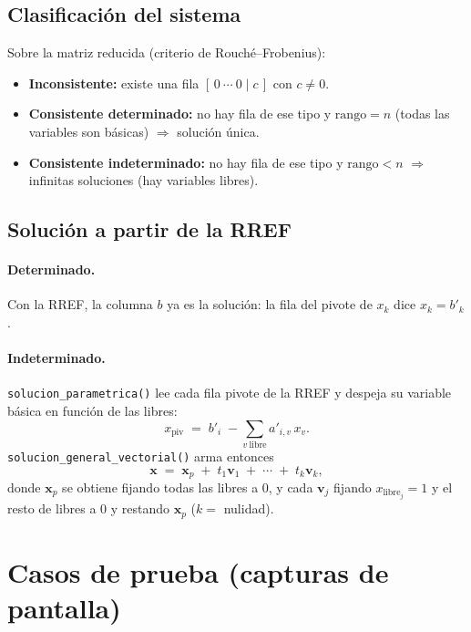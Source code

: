\documentclass[11pt,a4paper]{article}
\begin{document}
\subsection{Clasificaci\'on del sistema}

Sobre la matriz reducida (criterio de Rouch\'e--Frobenius):
\begin{itemize}[nosep]
  \item \textbf{Inconsistente:} existe una fila $[\,0\ \cdots\ 0 \mid c\,]$ con
        $c \neq 0$.
  \item \textbf{Consistente determinado:} no hay fila de ese tipo y
        $\text{rango} = n$ (todas las variables son b\'asicas) $\Rightarrow$
        soluci\'on \'unica.
  \item \textbf{Consistente indeterminado:} no hay fila de ese tipo y
        $\text{rango} < n$ $\Rightarrow$ infinitas soluciones (hay variables
        libres).
\end{itemize}

\subsection{Soluci\'on a partir de la RREF}

\paragraph{Determinado.} Con la RREF, la columna $b$ ya es la soluci\'on: la fila
del pivote de $x_k$ dice $x_k = b'_k$.

\paragraph{Indeterminado.} \texttt{solucion\_parametrica()} lee cada fila pivote de
la RREF y despeja su variable b\'asica en funci\'on de las libres:
\[
  x_{\text{piv}} \;=\; b'_i \;-\!\!\sum_{v\ \text{libre}} a'_{i,v}\,x_v .
\]
\texttt{solucion\_general\_vectorial()} arma entonces
\[
  \mathbf{x} \;=\; \mathbf{x}_p \;+\; t_1 \mathbf{v}_1 \;+\; \cdots \;+\; t_k \mathbf{v}_k ,
\]
donde $\mathbf{x}_p$ se obtiene fijando todas las libres a $0$, y cada
$\mathbf{v}_j$ fijando $x_{\text{libre}_j}=1$ y el resto de libres a $0$ y restando
$\mathbf{x}_p$ ($k = $ nulidad).

\section{Casos de prueba (capturas de pantalla)}
\end{document}
